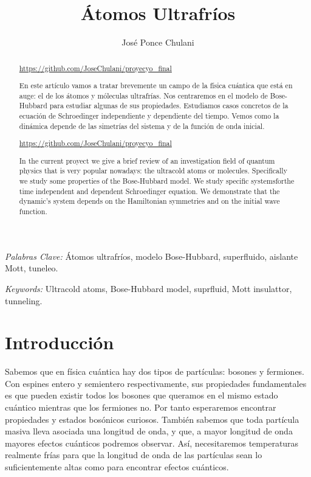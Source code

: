 \documentclass[11pt,a4paper]{article}
\begin{document}
\title{\'Atomos Ultrafr\'ios}
\author{Jos\'e Ponce Chulani}

\maketitle


\bigskip

\begin{abstract}
  \url{https://github.com/JoseChulani/proyecyo_final}
  
  En este artículo vamos a tratar brevemente un campo de la física cuántica que está en auge: el de los \'atomos y m\'oleculas ultrafr\'ias. Nos centraremos en el modelo de Bose-Hubbard para estudiar algunas de sus propiedades. Estudiamos casos concretos de la ecuación de Schroedinger independiente y dependiente del tiempo. Vemos como la dinámica depende de las simetrías del sistema y de la función de onda inicial.
\end{abstract}

\bigskip

\textit{Palabras Clave:}
Átomos ultrafríos, modelo Bose-Hubbard, superfluido, aislante Mott, tuneleo.

\newpage 

\begin{abstract}
  \url{https://github.com/JoseChulani/proyecyo_final}
  
  In the current proyect we give a brief review of an investigation field of quantum physics that is very popular nowadays: the ultracold atoms or molecules. Specifically we study some properties of the Bose-Hubbard model. We study specific systemsforthe time independent and dependent Schroedinger equation. We demonstrate that the dynamic's system depends on the Hamiltonian symmetries and on the initial wave function.
\end{abstract}

\bigskip

\textit{Keywords:}
Ultracold atoms, Bose-Hubbard model, suprfluid, Mott insulattor, tunneling.

\newpage

\section{Introducción}

Sabemos que en física cuántica hay dos tipos de partículas: bosones y fermiones. Con espines entero y semientero respectivamente, sus propiedades fundamentales es que pueden existir todos los bosones que queramos en el mismo estado cuántico mientras que los fermiones no. Por tanto esperaremos encontrar propiedades y estados bosónicos curiosos. También sabemos que toda partícula masiva lleva asociada una longitud de onda, y que, a mayor longitud de onda mayores efectos cuánticos podremos observar. Así, necesitaremos temperaturas realmente frías para que la longitud de onda de las partículas sean lo suficientemente altas como para encontrar efectos cuánticos.
\end{document}
